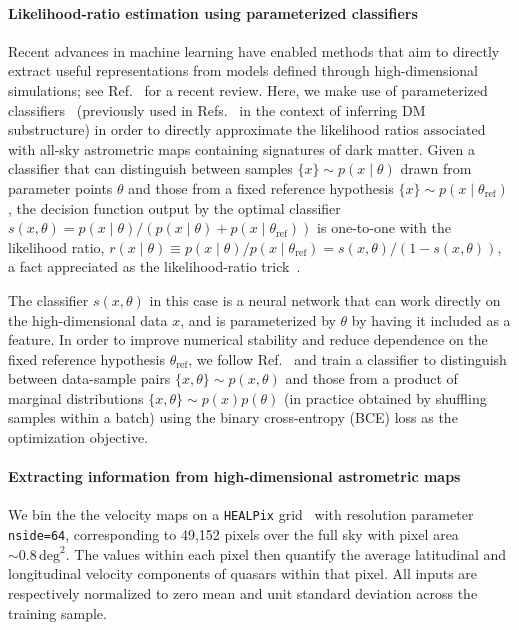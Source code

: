 \documentclass[preprint]{article}
\begin{document}
\paragraph{Likelihood-ratio estimation using parameterized classifiers} Recent advances in machine learning have enabled methods that aim to directly extract useful representations from models defined through high-dimensional simulations; see Ref.~\cite{Cranmer:2019eaq} for a recent review. Here, we make use of parameterized classifiers~\cite{Cranmer:2015bka,Baldi:2016fzo,Brehmer:2018eca,Brehmer:2018hga,Brehmer:2018kdj,Hermans:2019ioj} (previously used in Refs.~\cite{Brehmer:2019jyt,Hermans:2020skz} in the context of inferring DM substructure) in order to directly approximate the likelihood ratios associated with all-sky astrometric maps containing signatures of dark matter. Given a classifier that can distinguish between samples $\{x\} \sim p(x\mid\theta)$ drawn from parameter points $\theta$ and those from a fixed reference hypothesis $\{x\} \sim p(x\mid\theta_\mathrm{ref})$, the decision function output by the optimal classifier $s(x, \theta) = {p(x\mid\theta)}/{\left(p(x\mid\theta) + p(x\mid\theta_\mathrm{ref})\right)}$ is one-to-one with the likelihood ratio, $r(x\mid \theta) \equiv {p(x\mid\theta)}/{p(x\mid\theta_\mathrm{ref})}  = {s(x, \theta)}/{\left(1 - s(x, \theta)\right)}$, a fact appreciated as the likelihood-ratio trick~\cite{Cranmer:2015bka,mohamed2017learning}. 

The classifier $s(x, \theta)$ in this case is a neural network that can work directly on the high-dimensional data $x$, and is parameterized by $\theta$ by having it included as a feature. In order to improve numerical stability and reduce dependence on the fixed reference hypothesis $\theta_\mathrm{ref}$, we follow Ref.~\cite{Hermans:2019ioj} and train a classifier to distinguish between data-sample pairs $\{x, \theta\} \sim p(x,\theta)$ and those from a product of marginal distributions $\{x, \theta\} \sim p(x)p(\theta)$ (in practice obtained by shuffling samples within a batch) using the binary cross-entropy (BCE) loss as the optimization objective. 

\paragraph{Extracting information from high-dimensional astrometric maps} We bin the the velocity maps on a \texttt{HEALPix} grid~\cite{Gorski:2004by} with resolution parameter \texttt{nside=64}, corresponding to 49,152 pixels over the full sky with pixel area $\sim 0.8\,\mathrm{deg}^2$. The values within each pixel then quantify the average latitudinal and longitudinal velocity components of quasars within that pixel. All inputs are respectively normalized to zero mean and unit standard deviation across the training sample. 
\end{document}
